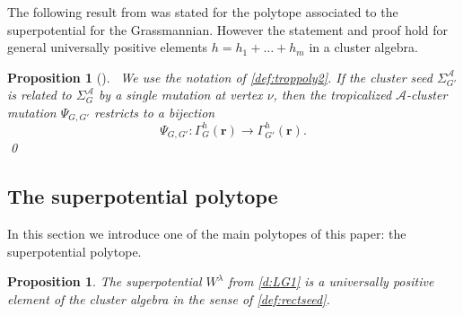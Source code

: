 \documentclass{amsart}
\newtheorem{proposition}[thm]{Proposition}
\theoremstyle{definition}
\numberwithin{equation}{section}
\newcommand{\rr}{\mathbf r}
\newcommand{\Q}{\Gamma}
\begin{document}
The following result from \cite{RW} was stated for the polytope associated to the superpotential for the Grassmannian.  However
 the statement and proof hold for general universally positive elements $h=h_1+ \dots + h_m$ in a cluster algebra.

\begin{proposition}[{\cite[Corollary 11.16]{RW}}]\label{prop:tropmutation}\
We use the notation of \cref{def:troppoly2}.
If the cluster seed $\Sigma^{\mathcal A}_{G'}$ is related to $\Sigma^{\mathcal A}_G$ by a single mutation 
at vertex $\nu$, then the  {tropicalized $\mathcal{A}$-cluster mutation} $\Psi_{G,G'}$ restricts to a bijection
\[
\Psi_{G,G'}: \Q^h_G(\rr)\to \Q^h_{G'}(\rr).
\]\qed
\end{proposition}



\subsection{The superpotential polytope}

In this section we
introduce one of the main polytopes of this paper: the superpotential polytope.

\begin{proposition}\label{prop:univpos}
The superpotential $W^{\lambda}$ from \cref{d:LG1} is a universally positive element
of the cluster algebra in the sense of \cref{def:rectseed}.
\end{proposition}
\end{document}
